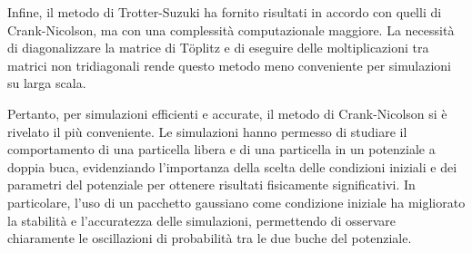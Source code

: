 \documentclass[a4paper, titlepage]{article}
\numberwithin{equation}{section}
\begin{document}
Infine, il metodo di Trotter-Suzuki ha fornito risultati in accordo con quelli di Crank-Nicolson, ma con una complessità computazionale maggiore. La necessità di diagonalizzare la matrice di Töplitz e di eseguire delle moltiplicazioni tra matrici non tridiagonali rende questo metodo meno conveniente per simulazioni su larga scala.

Pertanto, per simulazioni efficienti e accurate, il metodo di Crank-Nicolson si è rivelato il più conveniente. Le simulazioni hanno permesso di studiare il comportamento di una particella libera e di una particella in un potenziale a doppia buca, evidenziando l'importanza della scelta delle condizioni iniziali e dei parametri del potenziale per ottenere risultati fisicamente significativi. In particolare, l'uso di un pacchetto gaussiano come condizione iniziale ha migliorato la stabilità e l'accuratezza delle simulazioni, permettendo di osservare chiaramente le oscillazioni di probabilità tra le due buche del potenziale.




\pagebreak
\appendix
\end{document}
